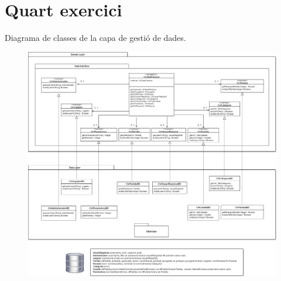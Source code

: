 \section{Quart exercici}

Diagrama de classes de la capa de gestió de dades.

    \begin{figure}[h]
    \centering
    \includegraphics[width=1.1\textwidth]{images/diagrama.png}
    \end{figure}
